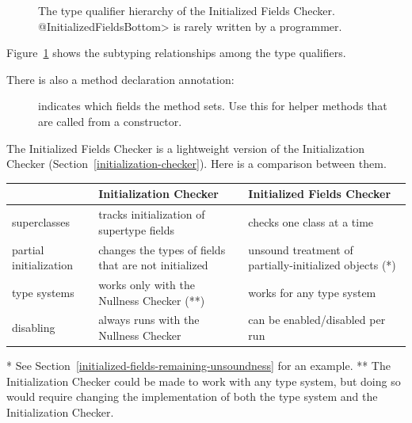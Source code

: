 \begin{figure}
\caption{The type qualifier hierarchy of the Initialized Fields Checker.
\<@InitializedFieldsBottom> is rarely written by a programmer.}
\label{fig-initialized-fields-hierarchy}
\end{figure}

Figure~\ref{fig-initialized-fields-hierarchy} shows the subtyping
relationships among the type qualifiers.

There is also a method declaration annotation:

\begin{description}
\item[]
  indicates which fields the method sets.  Use this for helper methods that
  are called from a constructor.
\end{description}



The Initialized Fields Checker is a lightweight version of the Initialization Checker
(Section~\ref{initialization-checker}).  Here is a comparison between them.

\noindent
\begin{small}
\begin{tabular}{| l | l | l |}
 \hline
 & Initialization Checker & Initialized Fields Checker
 \\ \hline
 superclasses
 & tracks initialization of supertype fields
 & checks one class at a time
 \\
 partial initialization
 & changes the types of fields that are not initialized
 & unsound treatment of partially-initialized objects (*)
 \\
 type systems
 & works only with the Nullness Checker (**)
 & works for any type system
 \\
 disabling
 & always runs with the Nullness Checker
 & can be enabled/disabled per run
 \\
 \hline
\end{tabular}

\noindent
* See Section~\ref{initialized-fields-remaining-unsoundness} for an example.
\newline
** The Initialization Checker could be made to work with any type system, but
doing so would require changing the implementation of both the type system and
the Initialization Checker.
\end{small}


